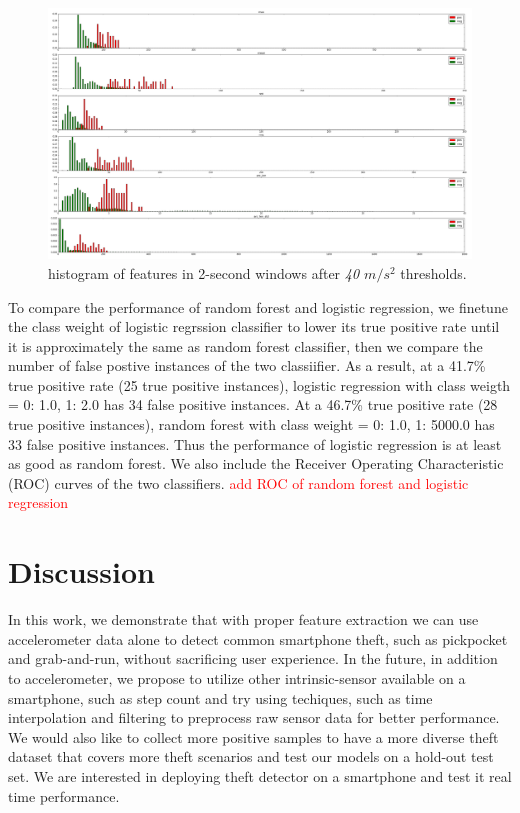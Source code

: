 \documentclass{soups}
\begin{document}
\begin{figure}[H]
\begin{center}
\includegraphics[width=1.0\columnwidth]{hist_features_after_win_size_1_2.png}
\end{center}
\caption{histogram of features in 2-second windows after \textit{40 $m/s^2$} thresholds.}
\end{figure}

To compare the performance of random forest and logistic regression, we finetune the class weight of logistic regrssion classifier to lower its true positive rate until it is approximately the same as random forest classifier, then we compare the number of false postive instances of the two classiifier. 
As a result, at a 41.7\% true positive rate (25 true positive instances), logistic regression with class weigth = {0: 1.0, 1: 2.0} has 34 false positive instances. 
At a 46.7\% true positive rate (28 true positive instances), random forest with class weight = {0: 1.0, 1: 5000.0} has 33 false positive instances. 
Thus the performance of logistic regression is at least as good as random forest.
We also include the Receiver Operating Characteristic (ROC) curves of the two classifiers. \textcolor{red}{ add ROC of random forest and logistic regression }




\section{Discussion}
In this work, we demonstrate that with proper feature extraction we can use accelerometer data alone to detect common smartphone theft, such as pickpocket and grab-and-run, without sacrificing user experience. 
In the future, in addition to accelerometer, we propose to utilize other intrinsic-sensor available on a smartphone, such as step count and try using techiques, such as time interpolation and filtering to preprocess raw sensor data for better performance. 
We would also like to collect more positive samples to have a more diverse theft dataset that covers more theft scenarios and test our models on a hold-out test set. 
We are interested in deploying theft detector on a smartphone and test it real time performance.
\end{document}
